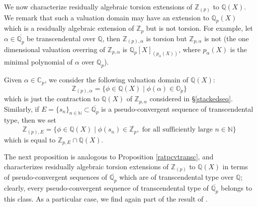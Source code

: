 \documentclass[10pt]{article}
\numberwithin{equation}{section}
\theoremstyle{definition}\newtheorem{Def}[equation]{Definition}
\theoremstyle{definition}\newtheorem{Ques}[equation]{Question}
\newcommand{\Q}{\mathbb{Q}}
\newcommand{\N}{\mathbb{N}}
\newcommand{\Z}{\mathbb{Z}}
\renewcommand{\O}{\mathbb{O}}
\newcommand{\C}{\mathbb{C}}
\newcommand{\oQp}{\overline{\Q_p}}
\newcommand{\oZp}{\overline{\Z_p}}
\begin{document}
We now characterize residually algebraic torsion extensions of $\Z_{(p)}$ to $\Q(X)$. We remark that such a valuation domain may have an extension to $\Q_p(X)$ which is a residually algebraic extension of $\Z_p$  but is not torsion. For example, let $\alpha\in\oQp$ be transcendental over $\Q$, then $\Z_{(p),\alpha}$ is torsion but $\Z_{p,\alpha}$ is not (the one dimensional valuation overring of $\Z_{p,\alpha}$ is $\Q_p[X]_{(p_{\alpha}(X))}$, where $p_{\alpha}(X)$ is the minimal polynomial of $\alpha$ over $\Q_p$).

Given $\alpha\in\C_p$, we consider the following valuation domain of $\Q(X)$:
$$\Z_{(p),\alpha}=\{\phi\in\Q(X)\mid\phi(\alpha)\in \O_p\}$$
which is just the contraction to $\Q(X)$ of $\Z_{p,\alpha}$ considered in \S \ref{stackedseq}. Similarly, if $E=\{s_n\}_{n\in\N}\subset\oQp$ is a pseudo-convergent sequence of transcendental type, then we set 
$$\Z_{(p),E}=\{\phi\in\Q(X)\mid \phi(s_n)\in\oZp,\text{ for all sufficiently large }n\in\N \}$$
which is equal to $\Z_{p,E}\cap\Q(X)$.

The next proposition is analogous to Proposition \ref{ratpcvtransc}, and characterizes residually algebraic torsion extensions of $\Z_{(p)}$ to $\Q(X)$ in terms of pseudo-convergent sequences of $\oQp$ which are of transcendental type over $\Q$; clearly, every pseudo-convergent sequence of transcendental type of $\oQp$ belongs to this class. As a particular case, we find again part of the result of \cite[Theorem 2.5]{PerTransc}.
\end{document}
